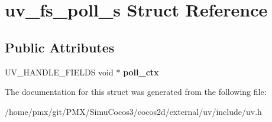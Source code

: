 \hypertarget{structuv__fs__poll__s}{}\section{uv\+\_\+fs\+\_\+poll\+\_\+s Struct Reference}
\label{structuv__fs__poll__s}
\subsection*{Public Attributes}
\begin{DoxyCompactItemize}
\item 
\mbox{\label{structuv__fs__poll__s_a5bdd550f484a6c6a8b0960d659b97ca2}} 
U\+V\+\_\+\+H\+A\+N\+D\+L\+E\+\_\+\+F\+I\+E\+L\+DS void $\ast$ {\bfseries poll\+\_\+ctx}
\end{DoxyCompactItemize}


The documentation for this struct was generated from the following file\+:\begin{DoxyCompactItemize}
\item 
/home/pmx/git/\+P\+M\+X/\+Simu\+Cocos3/cocos2d/external/uv/include/uv.\+h\end{DoxyCompactItemize}
